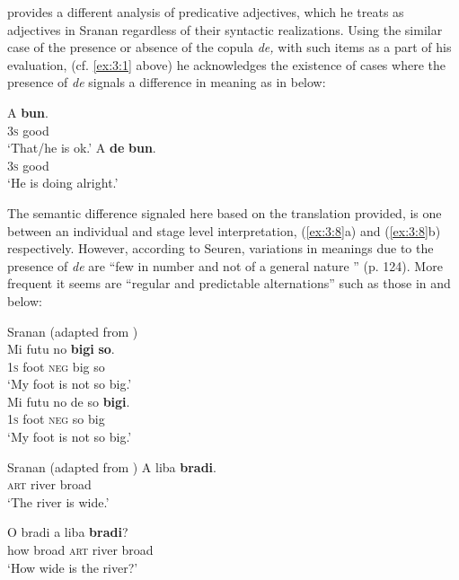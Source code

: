 \citet{Seuren1986} provides a different analysis of predicative
adjectives, which he treats as adjectives in Sranan regardless of
their syntactic realizations. Using the similar case of the presence
or absence of the copula \textit{de,} with such items as a part of his
evaluation, (cf. \ref{ex:3:1} above) he acknowledges the existence of
cases where the presence of \textit{de} signals a difference in
meaning as in  below:

\ea%
\label{ex:3:8}
\ea
\gll A \textbf{bun}.\\
		\textsc{3s} good\\
\glt `That\slash he is ok.'
\ex
\gll A \textbf{de} \textbf{bun}.\\
\textsc{3s} {\COP} good\\
\glt `He is doing alright.'\\
\z \z

The semantic difference signaled here based on the translation
provided, is one between an individual and stage level interpretation,
(\ref{ex:3:8}a) and (\ref{ex:3:8}b) respectively.  However, according
to Seuren, variations in meanings due to the presence of \textit{de}
are “few in number and not of a general nature ” (p. 124). More
frequent it seems are “regular and predictable alternations” such as
those in  and  below:

\ea \label{ex:3:9}
Sranan (adapted from \citealt[124]{Seuren1986})\\
\ea
\gll  Mi futu  no \textbf{bigi} \textbf{so}.\\
      \textsc{1s} foot  \textsc{neg} big so\\
\glt `My foot is not so big.'\\

\ex
\gll Mi futu  no      de   so \textbf{bigi}.\\
         \textsc{1s}  foot  \textsc{neg} {\COP} so big\\
\glt `My foot is not so big.'\\
\z \z


\ea\label{ex:3:10} Sranan (adapted from \citealt[124]{Seuren1986}) 
\ea
\gll  A liba \textbf{bradi}.\\
\textsc{art} river broad\\
\glt    `The river is wide.'

\ex
\gll  O bradi a liba \textbf{bradi}?  \\
    how broad \textsc{art} river broad\\
\glt `How wide is the river?'


